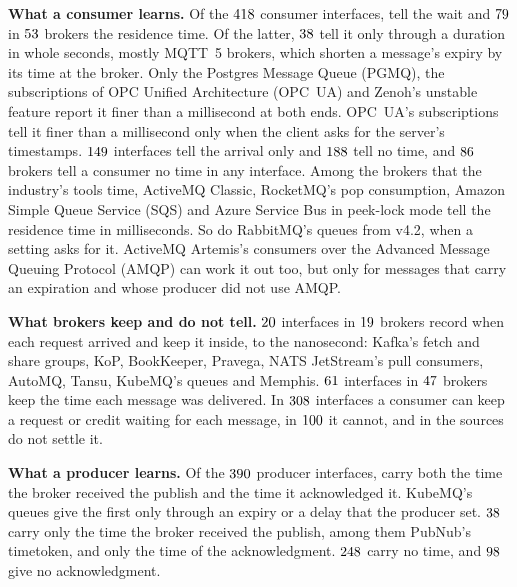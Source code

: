 \documentclass[10pt,journal,onecolumn]{IEEEtran}
\newcommand{\kafka}{Kafka}
\begin{document}
\textbf{What a consumer learns.} Of the $418$ consumer interfaces, \baWaitModesWord{}
tell the wait and $79$ in $53$ brokers the residence time. Of the latter,
$38$ tell it only through a duration in whole seconds, mostly MQTT~5 brokers, which
shorten a message's expiry by its time at the broker.
Only the Postgres Message Queue (PGMQ), the subscriptions of OPC Unified Architecture (OPC~UA)
and Zenoh's unstable feature report it finer than a millisecond at both ends. OPC~UA's
subscriptions tell it finer than a millisecond only when the client asks for the server's
timestamps. $149$ interfaces
tell the arrival only and $188$ tell no time, and $86$ brokers tell a
consumer no time in any interface. Among the brokers that the industry's tools time, ActiveMQ Classic, RocketMQ's pop consumption,
Amazon Simple Queue Service (SQS) and Azure Service Bus in peek-lock mode tell the residence time in
milliseconds. So do RabbitMQ's queues from v4.2, when a setting asks for it. ActiveMQ
Artemis's consumers over the Advanced Message Queuing Protocol (AMQP) can work it out too, but only
for messages that carry an expiration and whose producer did not use AMQP.

\textbf{What brokers keep and do not tell.} $20$ interfaces in
$19$ brokers record when each request arrived and keep it inside,
\baKeptRequestNsWord{} to the nanosecond: \kafka{}'s fetch and share groups, KoP, BookKeeper,
Pravega, NATS JetStream's pull consumers, AutoMQ, Tansu, KubeMQ's queues and Memphis.
$61$ interfaces in $47$ brokers keep the time each message was
delivered. In $308$ interfaces a consumer can keep a request or credit waiting for each
message, in $100$ it cannot, and in \baWaitUnsettledWord{} the sources do not settle it.

\textbf{What a producer learns.} Of the $390$ producer interfaces, \baHoldModesWord{}
carry both the time the broker received the publish and the time it acknowledged it. KubeMQ's
queues give the first only through an expiry or a delay that the producer set. $38$ carry only the time the broker received the
publish, among them PubNub's timetoken, and \baSendOnlyModesWord{} only the time of the
acknowledgment. $248$ carry no time, and $98$ give no acknowledgment.
\end{document}
